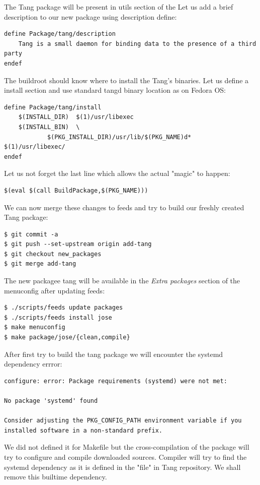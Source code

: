 The Tang package will be present in utils section of the
Let us add a brief description to our new package using description define:
\begin{lstlisting}[columns=fixed,basicstyle=\ttfamily\footnotesize,tabsize=4,backgroundcolor=\color{yellow!10}]
define Package/tang/description
	Tang is a small daemon for binding data to the presence of a third party
endef
\end{lstlisting}
The buildroot should know where to install the Tang's binaries.
Let us define a install section and use standard tangd binary location as on Fedora OS:
\begin{lstlisting}[columns=fixed,basicstyle=\ttfamily\footnotesize,tabsize=4,backgroundcolor=\color{yellow!10}]
define Package/tang/install
	$(INSTALL_DIR)	$(1)/usr/libexec
	$(INSTALL_BIN)	\
			$(PKG_INSTALL_DIR)/usr/lib/$(PKG_NAME)d*	$(1)/usr/libexec/
endef
\end{lstlisting}
Let us not forget the last line which allows the actual "magic" to happen:
\begin{lstlisting}[columns=fixed,basicstyle=\ttfamily\footnotesize,tabsize=4,backgroundcolor=\color{yellow!10}]
$(eval $(call BuildPackage,$(PKG_NAME)))
\end{lstlisting}
We can now merge these changes to feeds and try to build our freshly created Tang package:
\begin{lstlisting}[columns=fixed,basicstyle=\ttfamily\footnotesize,tabsize=4,backgroundcolor=\color{yellow!10}]
$ git commit -a
$ git push --set-upstream origin add-tang
$ git checkout new_packages
$ git merge add-tang
\end{lstlisting}
The new packagee tang will be available in the {\it Extra packages} section of the menuconfig after updating feeds:
\begin{lstlisting}[columns=fixed,basicstyle=\ttfamily\footnotesize,tabsize=4,backgroundcolor=\color{yellow!10}]
$ ./scripts/feeds update packages
$ ./scripts/feeds install jose
$ make menuconfig
$ make package/jose/{clean,compile}
\end{lstlisting}
After first try to build the tang package we will encounter the systemd dependency errror:
\begin{lstlisting}[columns=fixed,basicstyle=\ttfamily\footnotesize,tabsize=4,backgroundcolor=\color{yellow!10}]
configure: error: Package requirements (systemd) were not met:

No package 'systemd' found

Consider adjusting the PKG_CONFIG_PATH environment variable if you
installed software in a non-standard prefix.
\end{lstlisting}
We did not defined it for Makefile but the cross-compilation of the package will try to configure and compile downloaded sources.
Compiler will try to find the systemd dependency as it is defined in the "file" in Tang repository.
We shall remove this builtime dependency.

